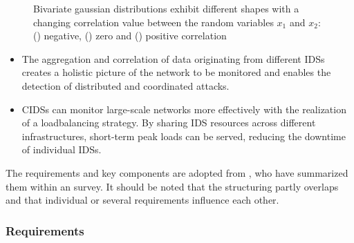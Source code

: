  \begin{figure}%
    \centering%
    \begin{subfigure}[b]{0.3\textwidth}%
        \centering\captionsetup{width=.8\linewidth}%
        \caption{}%
        \label{subfig:bivariate_neg}%
    \end{subfigure}%
    \hfill%
    \begin{subfigure}[b]{0.3\textwidth}%
        \centering\captionsetup{width=.8\linewidth}%
        \caption{}%
        \label{subfig:bivariate_neutral}%
    \end{subfigure}%
    \hfill%
    \begin{subfigure}[b]{0.3\textwidth}%
        \centering\captionsetup{width=.8\linewidth}%
        \caption{}%
        \label{subfig:bivariate_pos}%
    \end{subfigure}%
    \caption{Bivariate gaussian distributions exhibit different shapes with a changing correlation value between the random variables $x_1$ and $x_2$: () negative, () zero and () positive correlation}%
    \label{fig:multiple_bivariate}%
\end{figure}%

\begin{itemize}
    \item The aggregation and correlation of data originating from different IDSs creates a holistic picture of the network to be monitored and enables the detection of distributed and coordinated attacks.
    \item CIDSs can monitor large-scale networks more effectively with the realization of a loadbalancing strategy. By sharing IDS resources across different infrastructures, short-term peak loads can be served, reducing the downtime of individual IDSs.
\end{itemize}

The requirements and key components are adopted from \cite{vas_2015}, who have summarized them within an survey. It should be noted that the structuring partly overlaps and that individual or several requirements influence each other. 

\subsubsection{Requirements}

